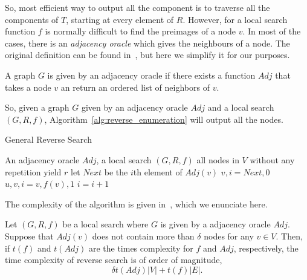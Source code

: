 \documentclass{article}
\begin{document}
So, most efficient way to output all the component is to traverse all
the components of $T$, starting at every element of $R$. 
However, for a local search function $f$ is normally difficult to find
the preimages of a node $v$. In most of the cases, there is an 
\textit{adjacency oracle} which gives the neighbours of a node. The
original definition can be found in~\cite{AvisFukuda}, but here we
simplify it for our purposes. 
\begin{definition}
  A graph $G$ is given by an  adjacency oracle if there exists  a
  function $Adj$ that takes a node $v$ an return an ordered list of
  neighbors of $v$.
\end{definition}
So, given a graph $G$ given by an adjacency oracle $Adj$ and a local
search $(G,R,f)$, Algorithm~\ref{alg:reverse_enumeration} will output
all the nodes. 
\begin{algorithm}
  \caption{General Reverse Search}
  \label{alg:reverse_enumeration}
  \begin{algorithmic}
    \REQUIRE An adjacency oracle $Adj$, a local search $(G,R,f)$
    \ENSURE all nodes in $V$ without any repetition
    \STATE yield $r$
    \STATE let $Next$ be the $i$th element of $Adj(v)$
    \STATE $v, i = Next, 0$
    \ELSE
    \ENDIF
    \ENDWHILE
    \ELSE
    \STATE $u, v, i  = v, f(v), 1$
    \STATE $i = i +1$
    \ENDWHILE
    \ENDIF
    \ENDWHILE
    \ENDFOR
  \end{algorithmic}
\end{algorithm}
The complexity of the algorithm is given in~\cite[Theorem
2.2]{AvisFukuda}, which we enunciate here.
\begin{theorem}
  Let   $(G, R, f)$ be a local search where  $G$ is
  given by a adjacency oracle $Adj$. Suppose that  $Adj(v)$ does not
  contain more than $\delta$ nodes for any $v\in V$. Then, if $t(f)$
  and $t(Adj)$ are the times complexity for $f$ and $Adj$,
  respectively, the time complexity of reverse search is of order of
  magnitude, 
  \begin{equation*}
    \delta t(Adj)|V| + t(f)|E|.
  \end{equation*}
\end{theorem}


\end{document}
